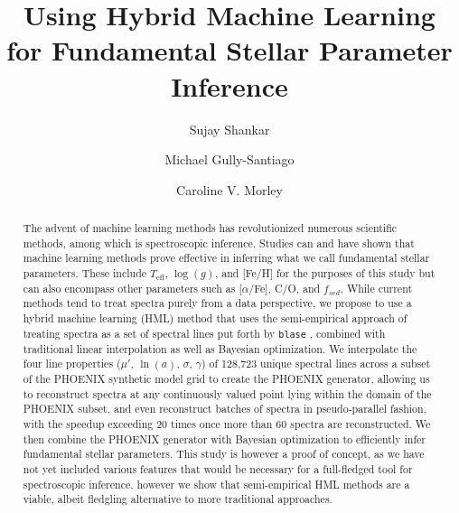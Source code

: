 \documentclass[twocolumn]{aastex631}
\begin{document}
\title{Using Hybrid Machine Learning for Fundamental Stellar Parameter Inference}
\author[0000-0002-2290-6810]{Sujay Shankar}
\author[0000-0002-4020-3457]{Michael Gully-Santiago}
\author[0000-0002-4404-0456]{Caroline V. Morley}


\begin{abstract}
    The advent of machine learning methods has revolutionized 
    numerous scientific methods, among which is spectroscopic 
    inference. Studies can and have shown that machine learning 
    methods prove effective in inferring what we call
    fundamental stellar parameters. These include $T_{\mathrm{eff}}$,
    $\log(g)$, and [Fe/H] for the purposes of this study but can 
    also encompass other parameters such as [$\alpha$/Fe], C/O, and
    $f_{sed}$. While current methods tend to treat spectra purely
    from a data perspective, we propose to use a hybrid machine 
    learning (HML) method that uses the semi-empirical approach 
    of treating spectra as a set of spectral lines put forth by 
    \texttt{blase} \citep{blase}, combined with traditional linear interpolation 
    as well as Bayesian optimization. We interpolate the four 
    line properties ($\mu'$, $\ln(a)$, $\sigma$, $\gamma$) of 
    128,723 unique spectral lines across a subset of the PHOENIX
    synthetic model grid \citep{PHOENIX} to create the PHOENIX generator, allowing
    us to reconstruct spectra at any continuously valued point 
    lying within the domain of the PHOENIX subset, and even reconstruct 
    batches of spectra in pseudo-parallel fashion, with the speedup 
    exceeding 20 times once more than 60 spectra are reconstructed. 
    We then combine the PHOENIX generator with Bayesian optimization to 
    efficiently infer fundamental stellar parameters. This study is 
    however a proof of concept, as we have not yet included various
    features that would be necessary for a full-fledged tool for 
    spectroscopic inference, however we show that semi-empirical 
    HML methods are a viable, albeit fledgling alternative to 
    more traditional approaches.
\end{abstract}
\end{document}
